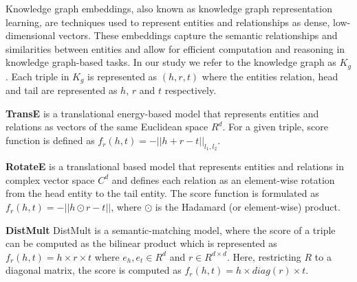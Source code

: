 {Knowledge graph embeddings, also known as knowledge graph representation learning, are techniques used to represent entities and relationships as dense, low-dimensional vectors. These embeddings capture the semantic relationships and similarities between entities and allow for efficient computation and reasoning in knowledge graph-based tasks. In our study we refer to the knowledge graph as $K_g$. Each triple in $K_g$ is represented as $(h,r,t)$ where the entities relation, head and tail are represented as  $h$, $r$ and $t$ respectively.

\textbf{TransE} \cite{bordes2013translating} is a translational energy-based model that represents entities and relations as vectors of the same Euclidean space $R^d$. For a given triple, score function is defined as $f_r(h,t) = -||h+r-t||_{l_1,l_2}$.

\textbf{RotateE} \cite{sun2019rotate} is a translational based model that represents entities and relations in complex vector space $C^d$ and defines each relation as an element-wise rotation from the head entity to the tail entity. The score function is formulated as $f_r(h,t) = - ||h\odot r - t||$, where $\odot$ is the Hadamard (or element-wise) product. 

\textbf{DistMult} \cite{yang2014embedding} DistMult is a semantic-matching model, where the score of a triple can be computed as the bilinear product which is represented as $f_r(h,t) = h\times r \times t$ where $e_h,e_t \in R^d$ and $r \in R^{d \times d}$. Here, restricting $R$ to a diagonal matrix, the score is computed as $f_r(h,t) = h\times diag(r) \times t$.



\vspace{-0.8em}
}
